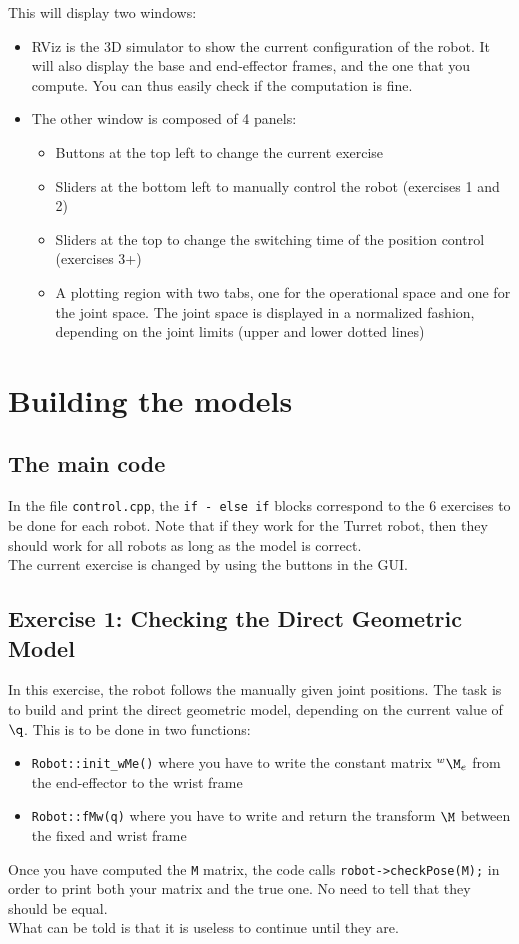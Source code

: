 \documentclass{ecnreport}
\begin{document}
This will display two windows:
\begin{itemize}
	\item RViz is the 3D simulator to show the current configuration of the robot. It will also display the base and end-effector frames, and the one that you compute. You can thus easily check if the computation is fine.
	\item The other window is composed of 4 panels:
	\begin{itemize}
		\item Buttons at the top left to change the current exercise
		\item Sliders at the bottom left to manually control the robot (exercises 1 and 2)
		\item Sliders at the top to change the switching time of the position control (exercises 3+)
		\item A plotting region with two tabs, one for the operational space and one for the joint space. The joint space is displayed in a normalized fashion, depending on the joint limits (upper and lower dotted lines)
	\end{itemize}
\end{itemize}


\section{Building the models}

\subsection*{The main code}

In the file \texttt{control.cpp}, the \texttt{if - else if} blocks correspond to the 6 exercises to be done for each robot. Note that if they work for the Turret robot, then 
they should work for all robots as long as the model is correct. \\
The current exercise is changed by using the buttons in the GUI.

\subsection*{Exercise 1: Checking the Direct Geometric Model}

In this exercise, the robot follows the manually given joint positions. The task is to build and print the direct geometric model, depending on the current value of $\q$. This is to be done in two functions:
\begin{itemize}
	\item \texttt{Robot::init\_wMe()} where you have to write the constant matrix $\wMe$ from the end-effector to the wrist frame
	\item \texttt{Robot::fMw(q)}  where you have to write and return the transform $\M$ between the fixed and wrist frame
\end{itemize}
Once you have computed the \texttt{M} matrix, the code calls \texttt{robot->checkPose(M);} in order to print both your matrix and the true one. No need to tell that they should be equal.\\
What can be told is that it is useless to continue until they are.
\end{document}
